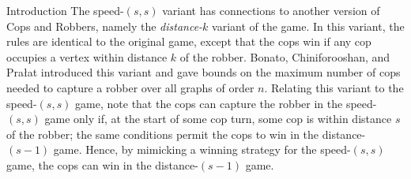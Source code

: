 \documentclass[12pt]{amsart}
\theoremstyle{definition}
\newcommand{\speeds}{c_{s,s}}
\begin{document}
\begin{section}{Introduction}
The speed-$(s,s)$ variant has connections to another version of Cops and Robbers, namely the \textit{distance-$k$} variant of the game.  In this variant, the rules are identical to the original game, except that the cops win if any cop occupies a vertex within distance $k$ of the robber.  Bonato, Chiniforooshan, and Pra\l{}at \cite{BCP10} introduced this variant and gave bounds on the maximum number of cops needed to capture a robber over all graphs of order $n$.  
Relating this variant to the speed-$(s,s)$ game, note that the cops can capture the robber in the speed-$(s,s)$ game only if, at the start of some cop turn, some cop is within distance $s$ of the robber; the same conditions permit the cops to win in the distance-$(s-1)$ game.  Hence, by mimicking a winning strategy for the speed-$(s,s)$ game, the cops can win in the distance-$(s-1)$ game.%


\end{section}
\end{document}
